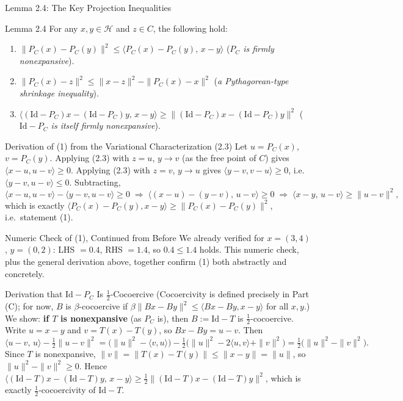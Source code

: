 \documentclass[aspectratio=169,10pt]{beamer}
\newcommand{\Id}{\mathrm{Id}}
\begin{document}
\begin{frame}[allowframebreaks]{Lemma 2.4: The Key Projection Inequalities}

  \begin{block}{Lemma 2.4}
    For any $x, y \in \mathcal{H}$ and $z \in C$, the following hold:
    \begin{enumerate}
      \item[(1)] $\|P_C(x) - P_C(y)\|^2 \le \langle P_C(x)-P_C(y),\, x-y\rangle$
        \quad (\emph{$P_C$ is firmly nonexpansive}).
      \item[(2)] $\|P_C(x) - z\|^2 \le \|x-z\|^2 - \|P_C(x)-x\|^2$
        \quad (\emph{a Pythagorean-type shrinkage inequality}).
      \item[(3)] $\langle (\Id-P_C)x - (\Id-P_C)y,\, x-y \rangle \ge
        \|(\Id-P_C)x - (\Id-P_C)y\|^2$ \quad (\emph{$\Id - P_C$ is itself
        firmly nonexpansive}).
    \end{enumerate}
  \end{block}

  \begin{block}{Derivation of (1) from the Variational Characterization (2.3)}
    Let $u = P_C(x)$, $v = P_C(y)$. Applying (2.3) with $z=u$, $y \to v$ (as
    the free point of $C$) gives $\langle x-u, u-v\rangle \ge 0$. Applying
    (2.3) with $z=v$, $y \to u$ gives $\langle y-v, v-u\rangle \ge 0$, i.e.
    $\langle y-v, u-v\rangle \le 0$. Subtracting,
    \[
      \langle x-u, u-v\rangle - \langle y-v, u-v\rangle \ge 0
      \;\Longrightarrow\;
      \langle (x-u)-(y-v),\, u-v\rangle \ge 0
      \;\Longrightarrow\;
      \langle x-y,\, u-v\rangle \ge \|u-v\|^2,
    \]
    which is exactly $\langle P_C(x)-P_C(y), x-y\rangle \ge \|P_C(x)-P_C(y)\|^2$,
    i.e.\ statement (1).
  \end{block}

  \framebreak

  \begin{block}{Numeric Check of (1), Continued from Before}
    We already verified for $x=(3,4)$, $y=(0,2)$: LHS $=0.4$, RHS $=1.4$, so
    $0.4 \le 1.4$ holds. This numeric check, plus the general derivation
    above, together confirm (1) both abstractly and concretely.
  \end{block}

  \begin{block}{Derivation that $\Id - P_C$ Is $\tfrac{1}{2}$-Cocoercive}
    (Cocoercivity is defined precisely in Part (C); for now, $B$ is
    $\beta$-cocoercive if $\beta\|Bx-By\|^2 \le \langle Bx-By, x-y\rangle$ for
    all $x,y$.) We show: \textbf{if $T$ is nonexpansive} (as $P_C$ is), then
    $B := \Id - T$ is $\tfrac12$-cocoercive. Write $u = x-y$ and
    $v = T(x)-T(y)$, so $Bx - By = u - v$. Then
    \[
      \langle u-v,\, u\rangle - \tfrac12\|u-v\|^2
      = \big(\|u\|^2 - \langle v,u\rangle\big)
        - \tfrac12\big(\|u\|^2 - 2\langle u,v\rangle + \|v\|^2\big)
      = \tfrac12\big(\|u\|^2 - \|v\|^2\big).
    \]
    Since $T$ is nonexpansive, $\|v\| = \|T(x)-T(y)\| \le \|x-y\| = \|u\|$, so
    $\|u\|^2 - \|v\|^2 \ge 0$. Hence
    $\langle (\Id-T)x-(\Id-T)y,\, x-y\rangle \ge \tfrac12\|(\Id-T)x-(\Id-T)y\|^2$,
    which is exactly $\tfrac12$-cocoercivity of $\Id-T$.
  \end{block}


\end{frame}
\end{document}
